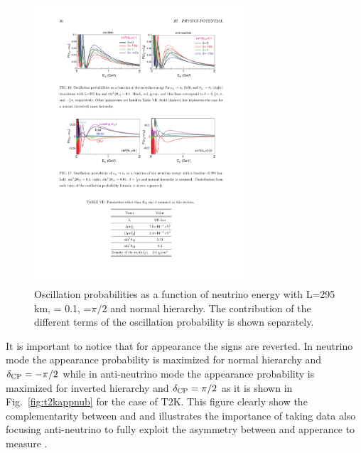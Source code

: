 \begin{figure} [h!]
\begin{center}
\includegraphics[width=8cm]{figures/papp_prob_2.pdf}
\caption{\label{fig:t2kappprob} Oscillation probabilities as a function of neutrino energy with L=295 km, \stot = 0.1, \dcp=$\pi/2$ and normal hierarchy. The contribution of the different terms of the oscillation probability is shown separately.}
\end{center}
\end{figure}

It is important to notice that for \nueb appearance the signs are reverted. In neutrino mode the appearance probability is maximized for normal hierarchy and $\delta_{\mathrm{CP}}=-\pi/2$ while in anti-neutrino mode the appearance probability is maximized for inverted hierarchy and $\delta_{\mathrm{CP}}=\pi/2$ as it is shown in Fig.~\ref{fig:t2kappnub} for the case of T2K. This figure clearly show the complementarity between \papp and \pappb and illustrates the importance of taking data also focusing anti-neutrino to fully exploit the asymmetry between \nue and \nueb apperance to measure \dcp.

